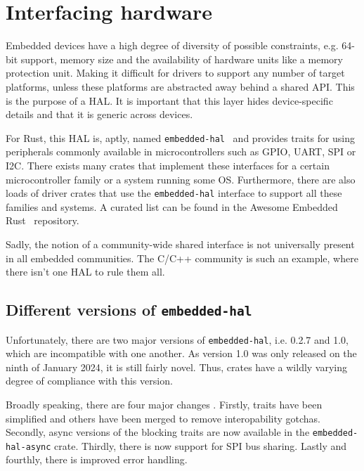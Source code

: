 \section{Interfacing hardware}
\label{sec:hardware}

Embedded devices have a high degree of diversity of possible constraints, e.g. 64-bit support, memory size and the availability of hardware units like a memory protection unit. Making it difficult for drivers to support any number of target platforms, unless these platforms are abstracted away behind a shared API. This is the purpose of a \gls{HAL}. It is important that this layer hides device-specific details and that it is generic across devices. 

For Rust, this \gls{HAL} is, aptly, named \texttt{embedded-hal}~\cite{gh:eh} and provides traits for using peripherals commonly available in microcontrollers such as \gls{GPIO}, \gls{UART}, \gls{SPI} or \gls{I2C}. There exists many crates that implement these interfaces for a certain microcontroller family or a system running some \gls{OS}. Furthermore, there are also loads of driver crates that use the \texttt{embedded-hal} interface to support all these families and systems. A curated list can be found in the Awesome Embedded Rust~\cite{gh:aer} repository.

Sadly, the notion of a community-wide shared interface is not universally present in all embedded communities. The C/C++ community is such an example, where there isn't one \gls{HAL} to rule them all.

\subsection{Different versions of \texttt{embedded-hal}}

Unfortunately, there are two major versions of \texttt{embedded-hal}, i.e. 0.2.7 and 1.0, which are incompatible with one another. 
As version 1.0 was only released on the ninth of January 2024, it is still fairly novel. Thus, crates have a wildly varying degree of compliance with this version. 

Broadly speaking, there are four major changes \cite{hal:1}. Firstly, traits have been simplified and others have been merged to remove interopability gotchas. 
Secondly, async versions of the blocking traits are now available in the \texttt{embedded-hal-async} crate. Thirdly, there is now support for \gls{SPI} bus sharing. Lastly and fourthly, there is improved error handling.

